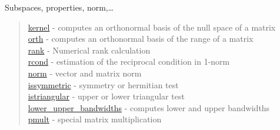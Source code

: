 Subspaces, properties, norm,\dots

\begin{quote}
\noindent
\hyperlink{kernel}{kernel} - computes an orthonormal basis of the null space of a matrix\\
\hyperlink{orth}{orth} - computes an orthonormal basis of the range of a matrix\\
\hyperlink{rank}{rank} - Numerical rank calculation \\
\hyperlink{rcond}{rcond} - estimation of the reciprocal condition in 1-norm\\
\hyperlink{norm}{norm} - vector and matrix norm\\
\hyperlink{issymmetric}{issymmetric} - symmetry or hermitian test\\
\hyperlink{istriangular}{istriangular} - upper or lower triangular test\\
\hyperlink{lower_upper_bandwidths}{lower\_upper\_bandwidths} - computes lower and upper bandwidths\\
\hyperlink{pmult}{pmult} - special matrix multiplication\\
\end{quote}

 
 
 
 
 

 







 
 
 
 





